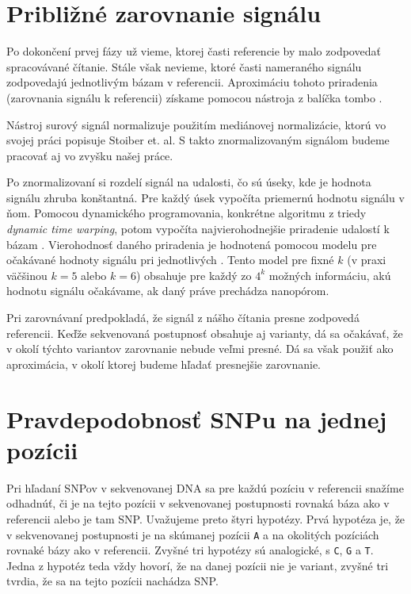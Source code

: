 \section{Približné zarovnanie signálu}
\label{sec:resquiggle}

Po dokončení prvej fázy už vieme, ktorej časti referencie
by malo zodpovedať spracovávané čítanie. Stále však nevieme, ktoré časti nameraného signálu
zodpovedajú jednotlivým bázam v referencii. Aproximáciu tohoto priradenia (zarovnania signálu k 
referencii)
získame pomocou nástroja \resquiggle{} z balíčka tombo \cite{tombo}. 

Nástroj \resquiggle{} surový signál normalizuje použitím mediánovej normalizácie, ktorú vo
svojej práci \cite{Stoiber2017} popisuje Stoiber et. al.
S takto znormalizovaným signálom budeme pracovať aj vo zvyšku našej práce.

Po znormalizovaní si \resquiggle{} rozdelí signál na udalosti, čo sú úseky, kde je hodnota signálu zhruba
konštantná. Pre každý úsek vypočíta priemernú hodnotu signálu v ňom.
Pomocou dynamického programovania, konkrétne algoritmu z triedy \emph{dynamic time warping}, potom vypočíta 
najvierohodnejšie priradenie udalostí k bázam \cite{resquiggle}. 
Vierohodnosť daného priradenia je hodnotená pomocou modelu pre očakávané hodnoty signálu pri
jednotlivých . Tento model pre fixné $k$ (v praxi väčšinou $k=5$ alebo $k=6$)
obsahuje pre každý zo $4^k$ možných  informáciu, akú hodnotu signálu
očakávame, ak daný \kmer{} práve prechádza nanopórom.


Pri zarovnávaní \resquiggle{} predpokladá, že signál z nášho čítania presne zodpovedá referencii.
Keďže sekvenovaná postupnosť obsahuje aj varianty, dá sa očakávať, že v okolí týchto variantov
zarovnanie nebude veľmi presné. Dá sa však použiť ako aproximácia, v okolí ktorej budeme hľadať
presnejšie zarovnanie.

\section{Pravdepodobnosť SNPu na jednej pozícii}
\label{sec:jedna_pozicia}

Pri hľadaní SNPov v sekvenovanej DNA sa pre každú pozíciu v referencii snažíme odhadnúť, či je
na tejto pozícii v sekvenovanej postupnosti rovnaká báza ako v referencii alebo je tam SNP. Uvažujeme
preto štyri hypotézy. Prvá hypotéza je, že v sekvenovanej postupnosti je na skúmanej
pozícii \texttt{A} a na okolitých pozíciách rovnaké bázy ako v referencii. Zvyšné tri hypotézy sú
analogické, s \texttt{C}, \texttt{G} a \texttt{T}. Jedna z hypotéz teda vždy hovorí, že na danej
pozícii nie je variant, zvyšné tri tvrdia, že sa na tejto pozícii nachádza SNP.

